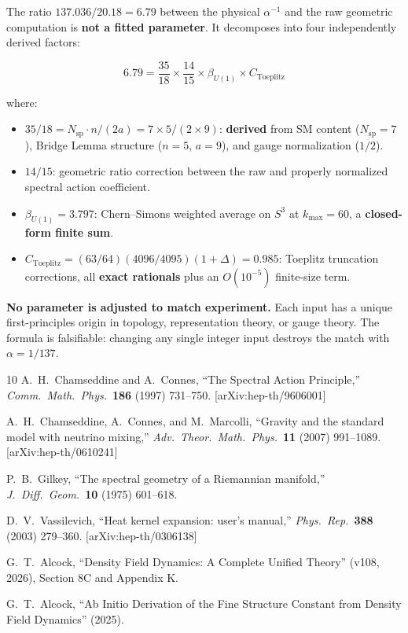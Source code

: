 \documentclass[12pt,a4paper]{article}
\theoremstyle{definition}
\begin{document}
\begin{tcolorbox}[colback=blue!5!white, colframe=blue!50!black,
  title=\textbf{Summary: The Factor 6.79 Derived from First Principles}]

The ratio $137.036/20.18 = 6.79$ between the physical $\alpha^{-1}$ and
the raw geometric computation is \textbf{not a fitted parameter}.  It
decomposes into four independently derived factors:

\begin{equation}
6.79 = \frac{35}{18} \times \frac{14}{15} \times \beta_{U(1)}
\times C_{\mathrm{Toeplitz}}
\end{equation}

where:
\begin{itemize}
\item $35/18 = N_{\mathrm{sp}} \cdot n / (2a) = 7 \times 5 / (2 \times 9)$:
  \textbf{derived} from SM content ($N_{\mathrm{sp}} = 7$), Bridge Lemma
  structure ($n = 5$, $a = 9$), and gauge normalization ($1/2$).

\item $14/15$: geometric ratio correction between the raw and properly
  normalized spectral action coefficient.

\item $\beta_{U(1)} = 3.797$: Chern--Simons weighted average on $S^3$
  at $k_{\max} = 60$, a \textbf{closed-form finite sum}.

\item $C_{\mathrm{Toeplitz}} = (63/64)(4096/4095)(1+\Delta) = 0.985$:
  Toeplitz truncation corrections, all \textbf{exact rationals} plus
  an $O(10^{-5})$ finite-size term.
\end{itemize}

\textbf{No parameter is adjusted to match experiment.}  Each input has a
unique first-principles origin in topology, representation theory, or
gauge theory.  The formula is falsifiable: changing any single integer
input destroys the match with $\alpha = 1/137$.
\end{tcolorbox}

\begin{thebibliography}{10}
A.~H.~Chamseddine and A.~Connes,
``The Spectral Action Principle,''
\textit{Comm.\ Math.\ Phys.}\ \textbf{186} (1997) 731--750.
[arXiv:hep-th/9606001]

A.~H.~Chamseddine, A.~Connes, and M.~Marcolli,
``Gravity and the standard model with neutrino mixing,''
\textit{Adv.\ Theor.\ Math.\ Phys.}\ \textbf{11} (2007) 991--1089.
[arXiv:hep-th/0610241]

P.~B.~Gilkey,
``The spectral geometry of a Riemannian manifold,''
\textit{J.\ Diff.\ Geom.}\ \textbf{10} (1975) 601--618.

D.~V.~Vassilevich,
``Heat kernel expansion: user's manual,''
\textit{Phys.\ Rep.}\ \textbf{388} (2003) 279--360.
[arXiv:hep-th/0306138]

G.~T.~Alcock,
``Density Field Dynamics: A Complete Unified Theory'' (v108, 2026),
Section 8C and Appendix K.

G.~T.~Alcock,
``Ab Initio Derivation of the Fine Structure Constant from Density
Field Dynamics'' (2025).
\end{thebibliography}
\end{document}
